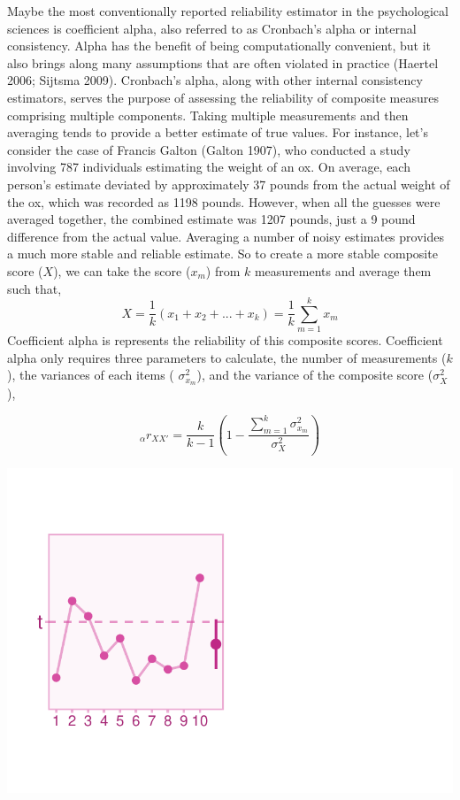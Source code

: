 \documentclass[
  letterpaper,
  DIV=11,
  numbers=noendperiod]{scrreprt}
\begin{document}
Maybe the most conventionally reported reliability estimator in the
psychological sciences is coefficient alpha, also referred to as
Cronbach's alpha or internal consistency. Alpha has the benefit of being
computationally convenient, but it also brings along many assumptions
that are often violated in practice (Haertel 2006; Sijtsma 2009).
Cronbach's alpha, along with other internal consistency estimators,
serves the purpose of assessing the reliability of composite measures
comprising multiple components. Taking multiple measurements and then
averaging tends to provide a better estimate of true values. For
instance, let's consider the case of Francis Galton (Galton 1907), who
conducted a study involving 787 individuals estimating the weight of an
ox. On average, each person's estimate deviated by approximately 37
pounds from the actual weight of the ox, which was recorded as 1198
pounds. However, when all the guesses were averaged together, the
combined estimate was 1207 pounds, just a 9 pound difference from the
actual value. Averaging a number of noisy estimates provides a much more
stable and reliable estimate. So to create a more stable composite score
(\(X\)), we can take the score (\(x_m\)) from \(k\) measurements and
average them such that, \[
X = \frac{1}{k}(x_1 + x_2 +...+x_k)= \frac{1}{k}\sum^k_{m=1}x_m
\] Coefficient alpha is represents the reliability of this composite
scores. Coefficient alpha only requires three parameters to calculate,
the number of measurements (\(k\)), the variances of each items (
\(\sigma^2_{x_m}\)), and the variance of the composite score
(\(\sigma^2_{X}\)),

\[
_\alpha r_{X X'} = \frac{k}{k-1}\left( 1 - \frac{\sum_{m=1}^k \sigma^2_{x_m}}{\sigma^2_{X}} \right)
\]

\includegraphics{unreliability_files/figure-pdf/unnamed-chunk-1-1.pdf}
\end{document}

